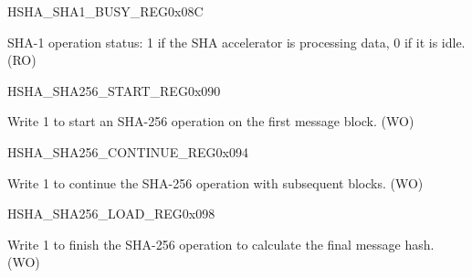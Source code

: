 \begin{register}{H}{SHA\_SHA1\_BUSY\_REG}{0x08C}\label{regdesc:SHASHA1BUSYREG}
%
%
\regnewline%
\begin{regdesc}\begin{reglist}
\item [SHA\_SHA1\_BUSY]SHA-1 operation status: 1 if the SHA accelerator is processing data, 0 if it is idle. (RO)
\end{reglist}\end{regdesc}
\end{register}


\begin{register}{H}{SHA\_SHA256\_START\_REG}{0x090}\label{regdesc:SHASHA256STARTREG}
%
%
\regnewline%
\begin{regdesc}\begin{reglist}
\item [SHA\_SHA256\_START]Write 1 to start an SHA-256 operation on the first message block. (WO)
\end{reglist}\end{regdesc}
\end{register}


\begin{register}{H}{SHA\_SHA256\_CONTINUE\_REG}{0x094}\label{regdesc:SHASHA256CONTINUEREG}
%
%
\regnewline%
\begin{regdesc}\begin{reglist}
\item [SHA\_SHA256\_CONTINUE]Write 1 to continue the SHA-256 operation with subsequent blocks. (WO)
\end{reglist}\end{regdesc}
\end{register}


\begin{register}{H}{SHA\_SHA256\_LOAD\_REG}{0x098}\label{regdesc:SHASHA256LOADREG}
%
%
\regnewline%
\begin{regdesc}\begin{reglist}
\item [SHA\_SHA256\_LOAD]Write 1 to finish the SHA-256 operation to calculate the final message hash. (WO)
\end{reglist}\end{regdesc}
\end{register}


